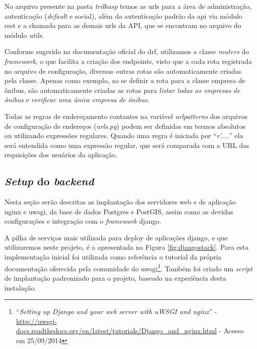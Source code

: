 No arquivo presente na pasta \textit{trilhasp} temos as urls para a área de administração, autenticação (\textit{default} e social), além da autenticação padrão da \gls{api} via módulo \gls{rest} e a chamada para as demais urls da API, que se encontram no arquivo do módulo \textit{utils}.

Conforme sugerido na documentação oficial do \gls{drf}, utilizamos a classe \textit{routers} do \textit{framework}, o que facilita a criação dos endpoints, visto que a cada rota registrada no arquivo de configuração, diversas outras rotas são automaticamente criadas pela classe. Apenas como exemplo, ao se definir a rota para a classe empresa de ônibus, são automaticamente criadas as rotas para \textit{listar todas as empresas de ônibus} e \textit{verificar uma única empresa de ônibus}.

Todas as regras de endereçamento contantes na variável \textit{urlpatterns} dos arquivos de configuração de endereços (\textit{urls.py}) podem ser definidas em termos absolutos ou utilizando expressões regulares. Quando uma regra é iniciada por ``\textit{r'....}'' ela será entendida como uma expressão regular, que será comparada com a URL das requisições dos usuários da aplicação.

\subsection{\textit{Setup} do \textit{backend}}
Nesta seção serão descritas as implantação dos servidores web e de aplicação \gls{nginx} e \gls{uwsgi}, da base de dados Postgres e PostGIS, assim como as devidas configurações e integração com o \textit{framework} \gls{django}.

A pilha de serviços mais utilizada para deploy de aplicações \gls{django}, e que utilizaremos neste projeto, é a apresentada na Figura \ref{fig:djangostack}.
Para esta implementação inicial foi utilizada como referência o tutorial da própria documentação oferecida pela comunidade do \gls{uwsgi}\footnote{``\textit{Setting up Django and your web server with uWSGI and nginx}'' - \url{http://uwsgi-docs.readthedocs.org/en/latest/tutorials/Django_and_nginx.html} - Acesso em 25/09/2014}. Também foi criado um \textit{script} de implantação padronizado para o projeto, baseado na experiência desta instalação.

